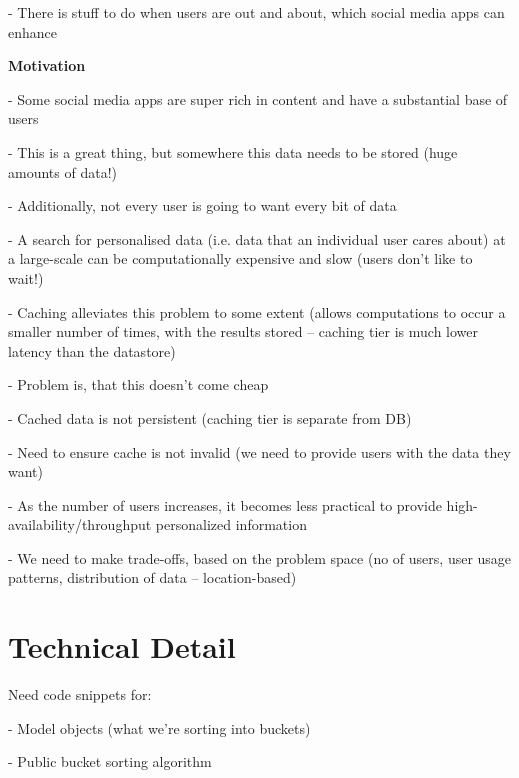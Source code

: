 \documentclass{article}
\begin{document}
- There is stuff to do when users are out and about, which social media apps can enhance

\textbf{Motivation}

- Some social media apps are super rich in content and have a substantial base of users

- This is a great thing, but somewhere this data needs to be stored (huge amounts of data!)

- Additionally, not every user is going to want every bit of data

- A search for personalised data (i.e. data that an individual user cares about) at a large-scale can be computationally expensive and slow (users don't like to wait!)

- Caching alleviates this problem to some extent (allows computations to occur a smaller number of times, with the results stored -- caching tier is much lower latency than the datastore)

- Problem is, that this doesn't come cheap

- Cached data is not persistent (caching tier is separate from DB)

- Need to ensure cache is not invalid (we need to provide users with the data they want)

- As the number of users increases, it becomes less practical to provide high-availability/throughput personalized information

- We need to make trade-offs, based on the problem space (no of users, user usage patterns, distribution of data -- location-based)


\section{Technical Detail} %
\label{sec:technical_detail}

Need code snippets for:

- Model objects (what we're sorting into buckets)

- Public bucket sorting algorithm

\begin{center}
\begin{minipage}{5.5in}%
\begin{python}[caption={Code Sample},label={code:ec_BS}] 

\end{python}
\end{minipage}
\end{center}
\end{document}
